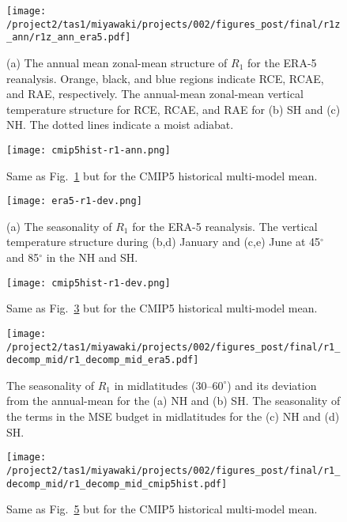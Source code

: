 \documentclass{ametsocV5}
\begin{document}
\begin{figure}[t]
  \noindent\texttt{[image: /project2/tas1/miyawaki/projects/002/figures\_post/final/r1z\_ann/r1z\_ann\_era5.pdf]}\\
  \caption{(a) The annual mean zonal-mean structure of $R_{1}$ for the ERA-5 reanalysis. Orange, black, and blue regions indicate RCE, RCAE, and RAE, respectively. The annual-mean zonal-mean vertical temperature structure for RCE, RCAE, and RAE for (b) SH and (c) NH. The dotted lines indicate a moist adiabat.}
  \label{fig:era5-r1-ann}
\end{figure}

\begin{figure}[t]
  \noindent\texttt{[image: cmip5hist-r1-ann.png]}\\
  \caption{Same as Fig.~\ref{fig:era5-r1-ann} but for the CMIP5 historical multi-model mean.}
  \label{fig:cmip5hist-r1-ann}
\end{figure}

\begin{figure}[t]
  \noindent\texttt{[image: era5-r1-dev.png]}\\
  \caption{(a) The seasonality of $R_{1}$ for the ERA-5 reanalysis. The vertical temperature structure during (b,d) January and (c,e) June at 45$^{\circ}$ and 85$^{\circ}$ in the NH and SH.}
  \label{fig:era5-r1-dev}
\end{figure}

\begin{figure}[t]
  \noindent\texttt{[image: cmip5hist-r1-dev.png]}\\
  \caption{Same as Fig.~\ref{fig:era5-r1-dev} but for the CMIP5 historical multi-model mean.}
  \label{fig:cmip5hist-r1-dev}
\end{figure}

\begin{figure}[t]
  \noindent\texttt{[image: /project2/tas1/miyawaki/projects/002/figures\_post/final/r1\_decomp\_mid/r1\_decomp\_mid\_era5.pdf]}\\
  \caption{The seasonality of $R_{1}$ in midlatitudes ($30$--$60^{\circ}$) and its deviation from the annual-mean for the (a) NH and (b) SH. The seasonality of the terms in the MSE budget in midlatitudes for the (c) NH and (d) SH.}
  \label{fig:era5-r1-decomp-mid}
\end{figure}

\begin{figure}[t]
  \noindent\texttt{[image: /project2/tas1/miyawaki/projects/002/figures\_post/final/r1\_decomp\_mid/r1\_decomp\_mid\_cmip5hist.pdf]}\\
  \caption{Same as Fig.~\ref{fig:era5-r1-decomp-mid} but for the CMIP5 historical multi-model mean.}
  \label{fig:cmip5hist-r1-decomp-mid}
\end{figure}
\end{document}
